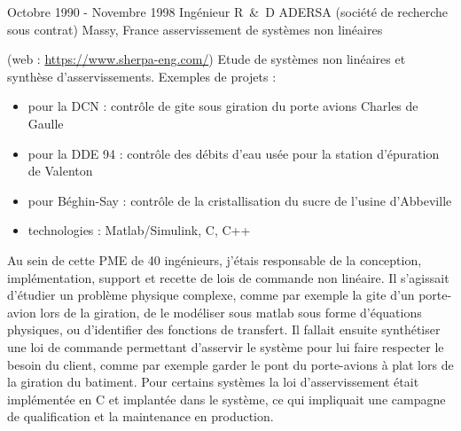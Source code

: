 \item{
\cventry
{Octobre 1990 - Novembre 1998} %
{Ingénieur R~\&~D } %
{ADERSA (société de recherche sous contrat)} %
{Massy, France} %
{asservissement de systèmes non linéaires
}
{ 
(web : \href{https://www.sherpa-eng.com/}{https://www.sherpa-eng.com/})
Etude de systèmes non linéaires et synthèse d'asservissements.
Exemples de projets :
\begin{itemize}
\item {pour la DCN : contrôle de gite sous giration du porte avions Charles de Gaulle}
\item {pour la DDE 94 : contrôle des débits d'eau usée pour la station d'épuration de Valenton}
\item {pour Béghin-Say : contrôle de la cristallisation du sucre de l'usine d'Abbeville}
\item {technologies : Matlab/Simulink, C, C++}
\end{itemize}
\vspace{3pt}
Au sein de cette PME de 40 ingénieurs, j'étais responsable de la conception, implémentation, support et recette de lois de commande non linéaire. Il s'agissait d'étudier un problème physique complexe, comme par exemple la gite d'un porte-avion lors de la giration, de le modéliser sous matlab sous forme d'équations physiques, ou d'identifier des fonctions de transfert. Il fallait ensuite synthétiser une loi de commande permettant d'asservir le système pour lui faire respecter le besoin du client, comme par exemple garder le pont du porte-avions à plat lors de la giration du batiment.
\vspace{3pt}
Pour certains systèmes la loi d'asservissement était implémentée en C et implantée dans le système, ce qui impliquait une campagne de qualification et la maintenance en production.
} %
} %